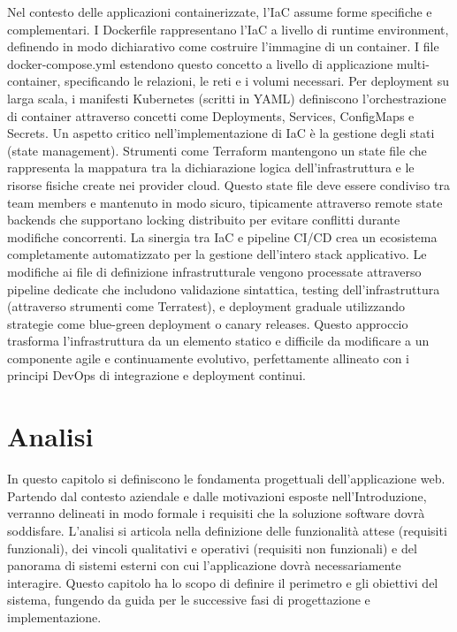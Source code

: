\documentclass[12pt,a4paper,openright,twoside]{book}
\begin{document}
Nel contesto delle applicazioni containerizzate, l'IaC assume forme specifiche e complementari. I Dockerfile rappresentano l'IaC a livello di runtime environment, definendo in modo dichiarativo come costruire l'immagine di un container. I file docker-compose.yml estendono questo concetto a livello di applicazione multi-container, specificando le relazioni, le reti e i volumi necessari. Per deployment su larga scala, i manifesti Kubernetes (scritti in YAML) definiscono l'orchestrazione di container attraverso concetti come Deployments, Services, ConfigMaps e Secrets.
Un aspetto critico nell'implementazione di IaC è la gestione degli stati (state management). Strumenti come Terraform mantengono un state file che rappresenta la mappatura tra la dichiarazione logica dell'infrastruttura e le risorse fisiche create nei provider cloud. Questo state file deve essere condiviso tra team members e mantenuto in modo sicuro, tipicamente attraverso remote state backends che supportano locking distribuito per evitare conflitti durante modifiche concorrenti.
La sinergia tra IaC e pipeline CI/CD crea un ecosistema completamente automatizzato per la gestione dell'intero stack applicativo. Le modifiche ai file di definizione infrastrutturale vengono processate attraverso pipeline dedicate che includono validazione sintattica, testing dell'infrastruttura (attraverso strumenti come Terratest), e deployment graduale utilizzando strategie come blue-green deployment o canary releases. Questo approccio trasforma l'infrastruttura da un elemento statico e difficile da modificare a un componente agile e continuamente evolutivo, perfettamente allineato con i principi DevOps di integrazione e deployment continui.

\chapter{Analisi}
\label{chap:analisi}

In questo capitolo si definiscono le fondamenta progettuali dell'applicazione web. Partendo dal contesto aziendale e dalle motivazioni esposte nell'Introduzione, verranno delineati in modo formale i requisiti che la soluzione software dovrà soddisfare. L'analisi si articola nella definizione delle funzionalità attese (requisiti funzionali), dei vincoli qualitativi e operativi (requisiti non funzionali) e del panorama di sistemi esterni con cui l'applicazione dovrà necessariamente interagire. Questo capitolo ha lo scopo di definire il perimetro e gli obiettivi del sistema, fungendo da guida per le successive fasi di progettazione e implementazione.
\end{document}
